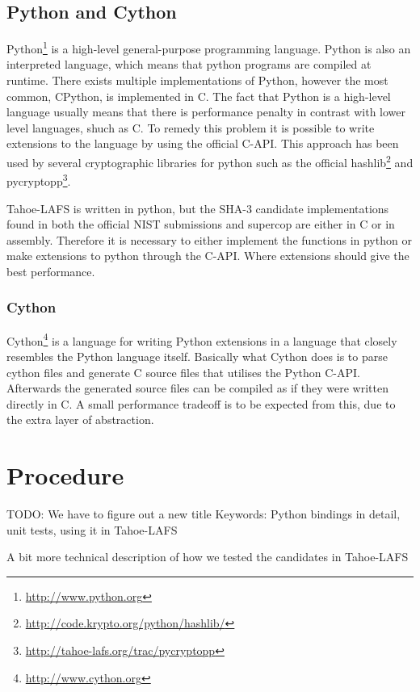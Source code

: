 \documentclass[english,12pt,a4paper]{book}
\begin{document}
\section{Python and Cython}
Python\footnote{\url{http://www.python.org}} is a high-level general-purpose
programming language. Python is also an interpreted language, which means that
python programs are compiled at runtime.  There exists multiple implementations
of Python, however the most common, CPython, is implemented in C. The fact that
Python is a high-level language usually means that there is performance penalty
in contrast with lower level languages, shuch as C. To remedy this problem it
is possible to write extensions to the language by using the official C-API.
This approach has been used by several cryptographic libraries for python such
as the official hashlib\footnote{\url{http://code.krypto.org/python/hashlib/}}
and pycryptopp\footnote{\url{http://tahoe-lafs.org/trac/pycryptopp}}.

Tahoe-\ac{LAFS} is written in python, but the SHA-3 candidate implementations found
in both the official NIST submissions and supercop are either in C or in
assembly. Therefore it is necessary to either implement the functions in python
or make extensions to python through the C-API. Where extensions should give
the best performance. %

\subsection{Cython}
Cython\footnote{\url{http://www.cython.org}} is a language for writing Python
extensions in a language that closely resembles the Python language itself.
Basically what Cython does is to parse cython files and generate C source files
that utilises the Python C-API. Afterwards the generated source files can be
compiled as if they were written directly in C. A small performance tradeoff is
to be expected from this, due to the extra layer of abstraction.

\chapter{Procedure}

TODO: We have to figure out a new title
Keywords: Python bindings in detail, unit tests, using it in Tahoe-LAFS

A bit more technical description of how we tested the candidates in Tahoe-LAFS
\end{document}
